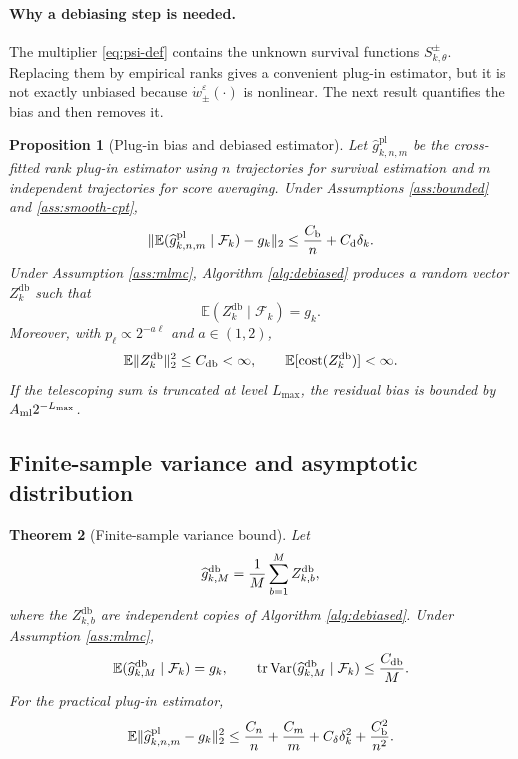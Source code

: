 \documentclass[11pt]{article}
\newtheorem{theorem}{Theorem}[section]
\newtheorem{proposition}[theorem]{Proposition}
\newcommand{\E}{\mathbb E}
\newcommand{\Var}{\operatorname{Var}}
\newcommand{\1}{\mathbf 1}
\newcommand{\tr}{\operatorname{tr}}
\DeclarePairedDelimiter{\norm}{\lVert}{\rVert}
\newcommand{\cF}{\mathcal F}
\newcommand{\eps}{\varepsilon}
\newcommand{\db}{\mathrm{db}}
\newcommand{\pl}{\mathrm{pl}}
\begin{document}
\paragraph{Why a debiasing step is needed.}
The multiplier \eqref{eq:psi-def} contains the unknown survival functions $S^\pm_{k,\theta}$.  Replacing them by empirical ranks gives a convenient plug-in estimator, but it is not exactly unbiased because $\dot w_\pm^\eps(\cdot)$ is nonlinear.  The next result quantifies the bias and then removes it.

\begin{proposition}[Plug-in bias and debiased estimator]\label{prop:debias}
Let $\widehat g_{k,n,m}^{\pl}$ be the cross-fitted rank plug-in estimator using $n$ trajectories for survival estimation and $m$ independent trajectories for score averaging.  Under Assumptions \ref{ass:bounded} and \ref{ass:smooth-cpt},
\begin{equation}\label{eq:plugin-bias}
 \norm{\E(\widehat g_{k,n,m}^{\pl}\mid\cF_k)-g_k}_2\le {C_{\rm b}\over n}+C_{\rm d}\delta_k.
\end{equation}
Under Assumption \ref{ass:mlmc}, Algorithm \ref{alg:debiased} produces a random vector $Z_k^{\db}$ such that
\begin{equation}\label{eq:db-unbiased}
 \E(Z_k^{\db}\mid\cF_k)=g_k.
\end{equation}
Moreover, with $p_\ell\propto2^{-a\ell}$ and $a\in(1,2)$,
\begin{equation}\label{eq:db-second-moment}
 \E\norm{Z_k^{\db}}_2^2\le C_{\db}<\infty,
 \qquad
 \E[\mathrm{cost}(Z_k^{\db})]<\infty.
\end{equation}
If the telescoping sum is truncated at level $L_{\max}$, the residual bias is bounded by $A_{\rm ml}2^{-L_{\max}}$.
\end{proposition}

\subsection{Finite-sample variance and asymptotic distribution}

\begin{theorem}[Finite-sample variance bound]\label{thm:variance}
Let
\[
 \widehat g_{k,M}^{\db}={1\over M}\sum_{b=1}^{M}Z_{k,b}^{\db},
\]
where the $Z_{k,b}^{\db}$ are independent copies of Algorithm \ref{alg:debiased}.  Under Assumption \ref{ass:mlmc},
\begin{equation}\label{eq:variance-bound}
 \E(\widehat g_{k,M}^{\db}\mid\cF_k)=g_k,
 \qquad
 \tr\Var(\widehat g_{k,M}^{\db}\mid\cF_k)
 \le {C_{\db}\over M}.
\end{equation}
For the practical plug-in estimator,
\begin{equation}\label{eq:plugin-mse}
 \E\norm{\widehat g_{k,n,m}^{\pl}-g_k}_2^2
 \le {C_n\over n}+{C_m\over m}+C_\delta\delta_k^2+{C_{\rm b}^2\over n^2}.
\end{equation}
\end{theorem}
\end{document}
